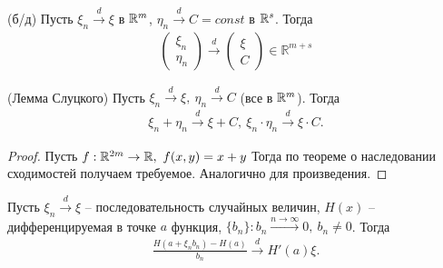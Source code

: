 \begin{proposition}
	(б/д) Пусть $\xi_n \xrightarrow{d} \xi$ в $\mathbb{R}^m$, $\eta_n \xrightarrow{d} C = const$ в $\mathbb{R}^s$. Тогда
	\begin{gather*}
	    \begin{pmatrix}
		\xi _{n}\\
		\eta _{n}
    	\end{pmatrix}\xrightarrow{d}
    	\begin{pmatrix}
    		\xi \\
    		C
    	\end{pmatrix} \in \mathbb{R}^{m+s}
	\end{gather*}
\end{proposition}

\begin{corollary}
	(Лемма Слуцкого) Пусть $\xi_n \xrightarrow{d} \xi,\ \eta_n \xrightarrow{d} C$ (все в $\mathbb{R}^m$). Тогда 
	\begin{gather*}
	    \xi_n+\eta_n \xrightarrow{d} \xi + C,\ \xi_n\cdot\eta_n \xrightarrow{d} \xi \cdot C.
	\end{gather*}
\end{corollary}

\begin{proof}
	Пусть $f:\mathbb{R}^{2m}\rightarrow \mathbb{R},\ f(x, y) = x + y$ Тогда по теореме о наследовании сходимостей получаем требуемое. Аналогично для произведения.
\end{proof}

\begin{example}
	Пусть $\xi_n \xrightarrow{d} \xi$ -- последовательность случайных величин, $H(x)$ -- дифференцируемая в точке $a$ функция, $\{b_n\}: b_n \xrightarrow{n\rightarrow \infty} 0,\ b_n \ne 0$. Тогда
	\begin{gather*}
	    \frac{H\left(a + \xi_nb_n\right) - H(a)}{b_n}\xrightarrow{d} H'(a)\xi.
	\end{gather*}
\end{example}

